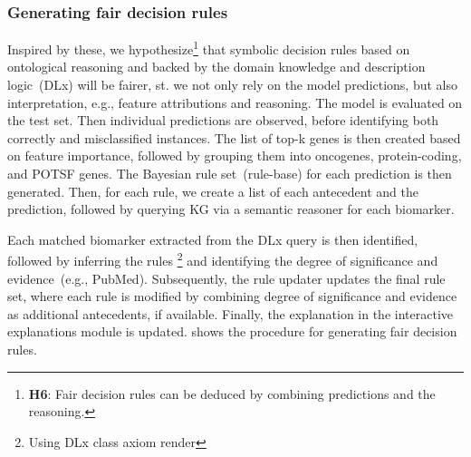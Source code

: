 \subsubsection{Generating fair decision rules}
Inspired by these, we hypothesize\footnote{\textbf{H6}: Fair decision rules can be deduced by combining predictions and the reasoning.} that symbolic decision rules based on ontological reasoning and backed by the domain knowledge and description logic~(DLx) will be fairer, st. we not only rely on the model predictions, but also interpretation, e.g., feature attributions and reasoning. 
The model is evaluated on the test set. Then individual predictions are observed, before identifying both correctly and misclassified instances. The list of top-k genes is then created based on feature importance, followed by grouping them into oncogenes, protein-coding, and POTSF genes. The Bayesian rule set~(rule-base) for each prediction is then generated. Then, for each rule, we create a list of each antecedent and the prediction, followed by querying KG via a semantic reasoner for each biomarker.

\hspace*{3.5mm} Each matched biomarker extracted from the  DLx query is then identified, followed by inferring the rules \footnote{Using DLx class axiom render} and identifying the degree of significance and evidence~(e.g., PubMed). Subsequently, the rule updater updates the final rule set, where each rule is modified by combining degree of significance and evidence as additional antecedents, if available. Finally, the explanation in the interactive explanations module is updated.  shows the procedure for generating fair decision rules. 

